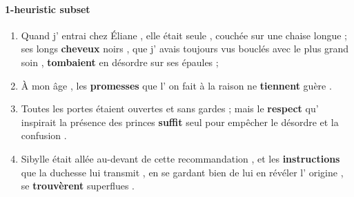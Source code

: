 \paragraph{1-heuristic subset}

\begin{enumerate}[itemsep=0pt,label=\arabic*).]
    \item Quand j' entrai chez Éliane , elle était seule , couchée sur une chaise longue ; ses longs \textbf{cheveux} noirs , que j' avais toujours vus bouclés avec le plus grand soin , \textbf{tombaient} en désordre sur ses épaules ;
    \item À mon âge , les \textbf{promesses} que l' on fait à la raison ne \textbf{tiennent} guère .
    \item Toutes les portes étaient ouvertes et sans gardes ; mais le \textbf{respect} qu' inspirait la présence des princes \textbf{suffit} seul pour empêcher le désordre et la confusion .
    \item Sibylle était allée au-devant de cette recommandation , et les \textbf{instructions} que la duchesse lui transmit , en se gardant bien de lui en révéler l' origine , se \textbf{trouvèrent} superflues .
\end{enumerate}


